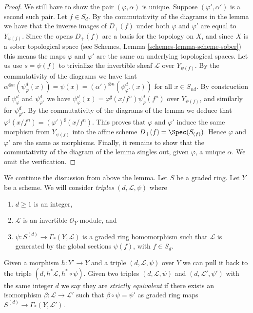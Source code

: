 \begin{proof}
\medskip\noindent
We still have to show the pair $(\varphi, \alpha)$ is unique.
Suppose $(\varphi', \alpha')$ is a second such pair.
Let $f \in S_d$. By the commutativity of the diagrams in the lemma we have
that the inverse images of $D_{+}(f)$ under both $\varphi$ and $\varphi'$
are equal to $Y_{\psi(f)}$. Since the opens $D_{+}(f)$ are a basis
for the topology on $X$, and since $X$ is a sober topological
space (see Schemes, Lemma \ref{schemes-lemma-scheme-sober})
this means the maps $\varphi$ and $\varphi'$ are the same
on underlying topological spaces. Let us use $s = \psi(f)$ to
trivialize the invertible sheaf $\mathcal{L}$ over $Y_{\psi(f)}$.
By the commutativity of the diagrams we have that
$\alpha^{\otimes n}(\psi^d_{\varphi}(x)) =
\psi(x) = (\alpha')^{\otimes n}(\psi^d_{\varphi'}(x))$
for all $x \in S_{nd}$. By construction of $\psi^d_{\varphi}$
and $\psi^d_{\varphi'}$ we have
$\psi^d_{\varphi}(x) = \varphi^\sharp(x/f^n) \psi^d_{\varphi}(f^n)$
over $Y_{\psi(f)}$,
and similarly for $\psi^d_{\varphi'}$. By the commutativity of
the diagrams of the lemma we deduce that
$\varphi^\sharp(x/f^n) = (\varphi')^\sharp(x/f^n)$.
This proves that $\varphi$ and $\varphi'$ induce the same morphism
from $Y_{\psi(f)}$ into the affine scheme $D_{+}(f) = \Spec(S_{(f)})$.
Hence $\varphi$ and $\varphi'$ are the same as morphisms.
Finally, it remains to show that the commutativity of the
diagram of the lemma singles out, given $\varphi$, a unique
$\alpha$. We omit the verification.
\end{proof}

We continue the discussion from above the lemma.
Let $S$ be a graded ring.
Let $Y$ be a scheme. We will consider {\it triples}
$(d, \mathcal{L}, \psi)$ where
\begin{enumerate}
\item $d \geq 1$ is an integer,
\item $\mathcal{L}$ is an invertible $\mathcal{O}_Y$-module, and
\item $\psi : S^{(d)} \to \Gamma_*(Y, \mathcal{L})$ is a graded
ring homomorphism such that $\mathcal{L}$ is generated by
the global sections $\psi(f)$, with $f \in S_d$.
\end{enumerate}
Given a morphism $h : Y' \to Y$ and a triple
$(d, \mathcal{L}, \psi)$ over $Y$ we can pull it back to the
triple $(d, h^*\mathcal{L}, h^* \circ \psi)$.
Given two triples $(d, \mathcal{L}, \psi)$ and
$(d, \mathcal{L}', \psi')$ with the same integer $d$
we say they are {\it strictly equivalent} if there exists
an isomorphism $\beta : \mathcal{L} \to \mathcal{L}'$
such that $\beta \circ \psi = \psi'$ as graded
ring maps $S^{(d)} \to \Gamma_*(Y, \mathcal{L}')$.

